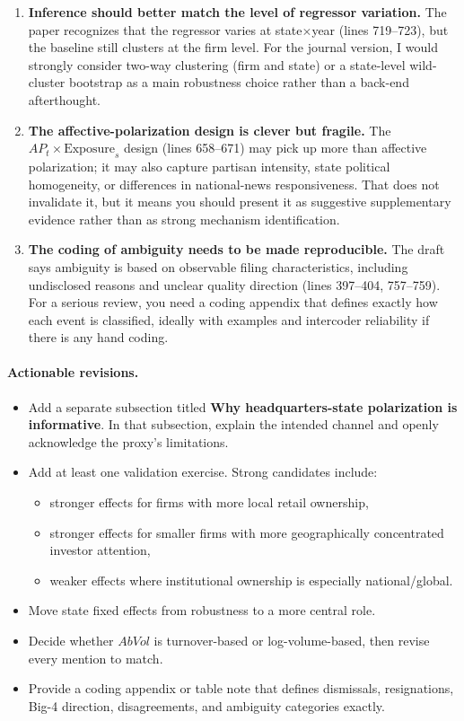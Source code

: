 \documentclass[12pt]{article}
\begin{document}
\begin{enumerate}
    \item \textbf{Inference should better match the level of regressor variation.} The paper recognizes that the regressor varies at state$\times$year (lines 719--723), but the baseline still clusters at the firm level. For the journal version, I would strongly consider two-way clustering (firm and state) or a state-level wild-cluster bootstrap as a main robustness choice rather than a back-end afterthought.

    \item \textbf{The affective-polarization design is clever but fragile.} The $AP_t \times \text{Exposure}_s$ design (lines 658--671) may pick up more than affective polarization; it may also capture partisan intensity, state political homogeneity, or differences in national-news responsiveness. That does not invalidate it, but it means you should present it as suggestive supplementary evidence rather than as strong mechanism identification.

    \item \textbf{The coding of ambiguity needs to be made reproducible.} The draft says ambiguity is based on observable filing characteristics, including undisclosed reasons and unclear quality direction (lines 397--404, 757--759). For a serious review, you need a coding appendix that defines exactly how each event is classified, ideally with examples and intercoder reliability if there is any hand coding.
\end{enumerate}

\paragraph{Actionable revisions.}
\begin{itemize}
    \item Add a separate subsection titled \textbf{Why headquarters-state polarization is informative}. In that subsection, explain the intended channel and openly acknowledge the proxy's limitations.
    \item Add at least one validation exercise. Strong candidates include:
    \begin{itemize}
        \item stronger effects for firms with more local retail ownership,
        \item stronger effects for smaller firms with more geographically concentrated investor attention,
        \item weaker effects where institutional ownership is especially national/global.
    \end{itemize}
    \item Move state fixed effects from robustness to a more central role.
    \item Decide whether $AbVol$ is turnover-based or log-volume-based, then revise every mention to match.
    \item Provide a coding appendix or table note that defines dismissals, resignations, Big-4 direction, disagreements, and ambiguity categories exactly.
\end{itemize}
\end{document}
